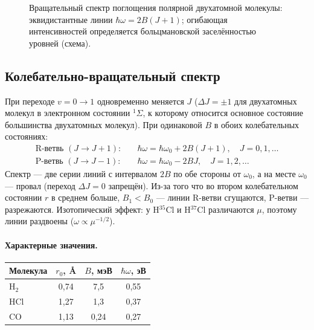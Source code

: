 \begin{figure}[htbp]
\centering
{}
\caption{Вращательный спектр поглощения полярной двухатомной молекулы: эквидистантные линии
$\hbar\omega=2B(J+1)$; огибающая интенсивностей определяется больцмановской заселённостью
уровней (схема).}
\label{fig:11:spec}
\end{figure}

\subsection{Колебательно-вращательный спектр}

При переходе $v=0\to1$ одновременно меняется $J$ ($\Delta J=\pm1$ для двухатомных молекул в электронном состоянии $^1\Sigma$,
к которому относится основное состояние большинства двухатомных молекул). При одинаковой $B$ в обоих колебательных состояниях:
\begin{align}
  \text{R-ветвь }(J\to J+1):\quad &\hbar\omega=\hbar\omega_0+2B(J+1),\quad J=0,1,\dots\\
  \text{P-ветвь }(J\to J-1):\quad &\hbar\omega=\hbar\omega_0-2BJ,\quad J=1,2,\dots
\end{align}
Спектр — две серии линий с интервалом $2B$ по обе стороны от $\omega_0$, а на месте $\omega_0$ — провал
(переход $\Delta J=0$ запрещён). Из-за того что во втором колебательном состоянии $r$ в среднем больше,
$B_1<B_0$ — линии R-ветви сгущаются, P-ветви — разрежаются. Изотопический эффект: у H$^{35}$Cl и H$^{37}$Cl
различаются $\mu$, поэтому линии раздвоены ($\omega\propto\mu^{-1/2}$).

\paragraph{Характерные значения.}
\begin{center}
\small
\begin{tabular}{@{}lccc@{}}
\toprule
Молекула & $r_0$, Å & $B$, мэВ & $\hbar\omega$, эВ \\
\midrule
H$_2$ & 0{,}74 & 7{,}5 & 0{,}55 \\
HCl & 1{,}27 & 1{,}3 & 0{,}37 \\
CO & 1{,}13 & 0{,}24 & 0{,}27 \\
\bottomrule
\end{tabular}
\end{center}

